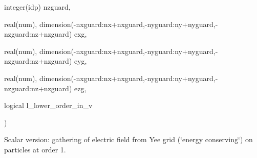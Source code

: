 {\begin{DoxyParamCaption}
\item[{integer(idp)}]{nzguard, }
\item[{real(num), dimension(-\/nxguard\+:nx+nxguard,-\/nyguard\+:ny+nyguard,-\/nzguard\+:nz+nzguard)}]{exg, }
\item[{real(num), dimension(-\/nxguard\+:nx+nxguard,-\/nyguard\+:ny+nyguard,-\/nzguard\+:nz+nzguard)}]{eyg, }
\item[{real(num), dimension(-\/nxguard\+:nx+nxguard,-\/nyguard\+:ny+nyguard,-\/nzguard\+:nz+nzguard)}]{ezg, }
\item[{logical}]{l\+\_\+lower\+\_\+order\+\_\+in\+\_\+v}
\end{DoxyParamCaption}
)}\hypertarget{field__gathering__3d__o1_8_f90_a13e24ff5639b3dcf1e9cd8e51a1caf53}{}\label{field__gathering__3d__o1_8_f90_a13e24ff5639b3dcf1e9cd8e51a1caf53}


Scalar version\+: gathering of electric field from Yee grid (\char`\"{}energy conserving\char`\"{}) on particles at order 1. 

